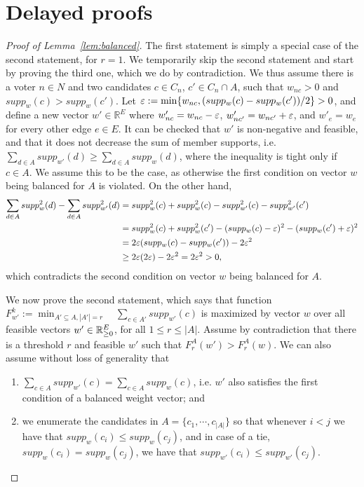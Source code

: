 
\section{Delayed proofs}\label{s:proofs}

\begin{proof}[Proof of Lemma~\ref{lem:balanced}]
The first statement is simply a special case of the second statement, for $r=1$. 
We temporarily skip the second statement and start by proving the third one, which we do by contradiction. 
We thus assume there is a voter $n\in N$ and two candidates $c\in C_n$, $c'\in C_n\cap A$, such that $w_{nc}>0$ and $supp_w(c) > supp_w(c')$. 
Let $\varepsilon:=\min\{w_{nc}, (supp_w(c)-supp_w(c'))/2\}>0$, and define a new vector $w'\in\mathbb{R}^E$ where $w'_{nc}=w_{nc}-\varepsilon$, $w'_{nc'}=w_{nc'}+\varepsilon$, and $w'_e=w_e$ for every other edge $e\in E$. 
It can be checked that $w'$ is non-negative and feasible, and that it does not decrease the sum of member supports, i.e. $\sum_{d\in A} supp_{w'}(d)\geq \sum_{d\in A} supp_{w}(d)$, where the inequality is tight only if $c\in A$. We assume this to be the case, as otherwise the first condition on vector $w$ being balanced for $A$ is violated. On the other hand,
\begin{align*}
    \sum_{d\in A} supp_{w}^2(d) - \sum_{d\in A} supp_{w'}^2(d) &= supp_w^2(c) + supp_w^2(c) - supp_{w'}^2(c) - supp_{w'}^2(c') \\
    &= supp_w^2(c) + supp_w^2(c') - (supp_w(c)-\varepsilon)^2 - (supp_w(c')+\varepsilon)^2 \\
    &= 2\varepsilon( supp_w(c) - supp_w(c')) -2\varepsilon^2 \\
    &\geq 2\varepsilon(2\varepsilon) - 2\varepsilon^2 = 2\varepsilon^2 >0,
\end{align*}
which contradicts the second condition on vector $w$ being balanced for $A$.

We now prove the second statement, which says that function 
$F_{w'}^k:=\min_{A'\subseteq A, |A'|=r} \quad \sum_{c\in A'} supp_{w'}(c)$ 
is maximized by vector $w$ over all feasible vectors $w'\in\mathbb{R}_{\geq 0}^E$, for all $1\leq r\leq |A|$. 
Assume by contradiction that there is a threshold $r$ and feasible $w'$ such that $F_r^A(w')>F_r^A(w)$. We can also assume without loss of generality that 
\begin{enumerate}
    \item $\sum_{c\in A} supp_{w'}(c)=\sum_{c\in A} supp_{w}(c)$, i.e. $w'$ also satisfies the first condition of a balanced weight vector; and  
    \item we enumerate the candidates in $A=\{c_1, \cdots, c_{|A|}\}$ so that whenever $i<j$ we have that $supp_w(c_i)\leq supp_w(c_j)$, and in case of a tie, $supp_w(c_i)= supp_w(c_j)$, we have that $supp_{w'}(c_i)\leq supp_{w'}(c_j)$. 
\end{enumerate}


\end{proof}
